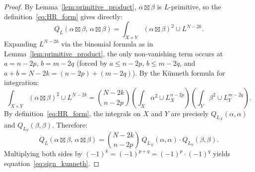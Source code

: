 \documentclass[aps,prd,twocolumn,superscriptaddress,nofootinbib]{revtex4-2}
\theoremstyle{definition}
\theoremstyle{remark}
\begin{document}
\begin{proof}
By Lemma~\ref{lem:primitive_product}, $\alpha \boxtimes \beta$ is $L$-primitive, so the definition~\eqref{eq:HR_form} gives directly:
\[
Q_L(\alpha \boxtimes \beta,\, \alpha \boxtimes \beta) = \int_{X \times Y} (\alpha \boxtimes \beta)^2 \cup L^{N-2k}.
\]
Expanding $L^{N-2k}$ via the binomial formula as in Lemma~\ref{lem:primitive_product}, the only non-vanishing term occurs at $a = n - 2p$, $b = m - 2q$ (forced by $a \leq n-2p$, $b \leq m-2q$, and $a + b = N - 2k = (n-2p) + (m-2q)$). By the K\"unneth formula for integration:
\[
\int_{X \times Y} (\alpha \boxtimes \beta)^2 \cup L^{N-2k} = \binom{N-2k}{n-2p} \left(\int_X \alpha^2 \cup L_X^{n-2p}\right) \left(\int_Y \beta^2 \cup L_Y^{m-2q}\right).
\]
By definition~\eqref{eq:HR_form}, the integrals on $X$ and $Y$ are precisely $Q_{L_X}(\alpha, \alpha)$ and $Q_{L_Y}(\beta, \beta)$. Therefore:
\[
Q_L(\alpha \boxtimes \beta,\, \alpha \boxtimes \beta) = \binom{N-2k}{n-2p}\, Q_{L_X}(\alpha, \alpha) \cdot Q_{L_Y}(\beta, \beta).
\]
Multiplying both sides by $(-1)^k = (-1)^{p+q} = (-1)^p \cdot (-1)^q$ yields equation~\eqref{eq:sign_kunneth}.
\end{proof}
\end{document}
